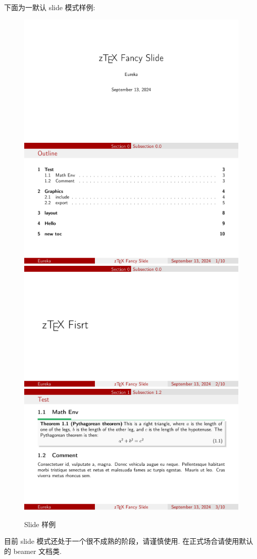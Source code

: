 下面为一默认 slide 模式样例:
\begin{figure}[!htb]
  \centering
  \includegraphics[width=.45\linewidth]{./pics/doc2slide_1.pdf}
  \includegraphics[width=.45\linewidth]{./pics/doc2slide_2.pdf}
  \includegraphics[width=.45\linewidth]{./pics/doc2slide_3.pdf}
  \includegraphics[width=.45\linewidth]{./pics/doc2slide_4.pdf}
  \caption{Slide 样例}
  \label{fig:slide-example}
\end{figure}

\begin{remark}
目前 slide 模式还处于一个很不成熟的阶段，请谨慎使用. 在正式场合请使用默认的 beamer 文档类.
\end{remark}

